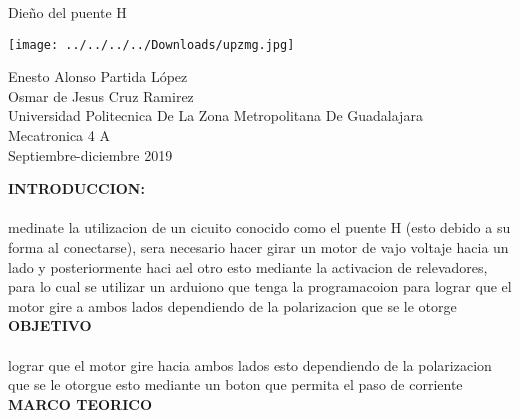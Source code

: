 \documentclass[12pt]{report}
\begin{document}
 
\begin{center}
{\Huge Dieño del puente H}
\end{center}
\begin{center}
\texttt{[image: ../../../../Downloads/upzmg.jpg]} 
\end{center} 
{\Huge Enesto Alonso Partida López\\Osmar de Jesus Cruz Ramirez\\ Universidad Politecnica De La Zona Metropolitana De Guadalajara\\ Mecatronica 4 A\\ Septiembre-diciembre 2019}
\date{25 de octubre 2019}
 
\newpage

{\huge \textbf{INTRODUCCION:}\\}\\


{\large medinate la utilizacion de un cicuito conocido como el puente H (esto debido a su forma al conectarse), sera necesario hacer girar un motor de vajo voltaje hacia un lado y posteriormente haci ael otro esto mediante la activacion de relevadores, para lo cual se utilizar un arduiono que tenga la programacoion para lograr que el motor gire a ambos lados dependiendo de la polarizacion que se le otorge}\\
 

{\huge \textbf{OBJETIVO}\\}\\


{\large lograr que el motor gire hacia ambos lados esto dependiendo de la polarizacion que se le otorgue esto mediante un boton que permita el paso de corriente}\\



{\huge \textbf{MARCO TEORICO}\\}\\
\end{document}
